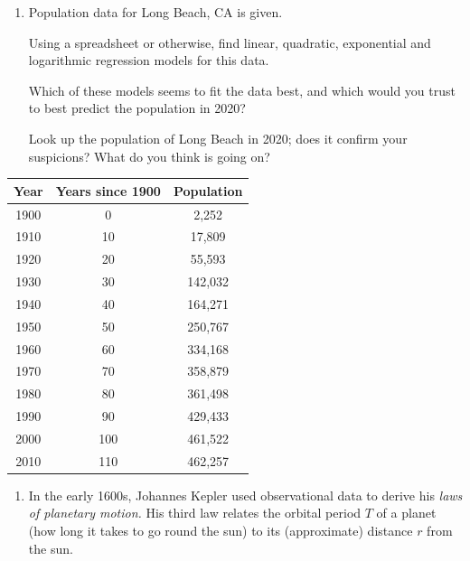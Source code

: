 \begin{exercises}{}{}
	
	\pagebreak[3]
		
		
	\begin{minipage}[t]{0.55\linewidth}\vspace{-\parsep}
		\begin{enumerate}[resume]
	  	\item Population data for Long Beach, CA is given.\par
	   	Using a spreadsheet or otherwise, find linear, quadratic, exponential and logarithmic regression models for this data.\par
	   	Which of these models seems to fit the data best, and which would you trust to best predict the population in 2020?\par
	   	Look up the population of Long Beach in 2020; does it confirm your suspicions? What do you think is going on?
	  \end{enumerate}
	\end{minipage}
	\hfill
	\begin{minipage}[t]{0.43\linewidth}\vspace{-\parsep}
	  \hfill\renewcommand{\arraystretch}{1.1}
	  \begin{tabular}{c|c|c}
			Year&Years since 1900&Population\\\hline
			1900&0&2,252\\
			1910&10&17,809\\
			1920&20&55,593\\
			1930&30&142,032\\
			1940&40&164,271\\
			1950&50&250,767\\
			1960&60&334,168\\
			1970&70&358,879\\
			1980&80&361,498\\
			1990&90&429,433\\
			2000&100&461,522\\
			2010&110&462,257%
	  \end{tabular}
	\end{minipage}
	  
	 
	\begin{enumerate}[resume]  
	  \item In the early 1600s, Johannes Kepler used observational data to derive his \emph{laws of planetary motion.} His third law relates the orbital period $T$ of a planet (how long it takes to go round the sun) to its (approximate) distance $r$ from the sun.\par
	

\end{enumerate}
\end{exercises}
